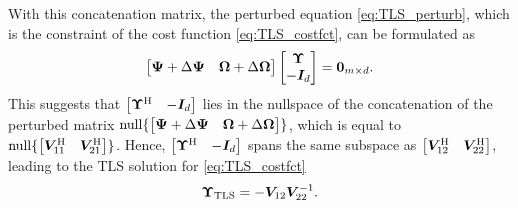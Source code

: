 With this concatenation matrix, the perturbed equation \eqref{eq:TLS_perturb}, which is the constraint of the cost function \eqref{eq:TLS_costfct}, can be formulated as
\begin{equation} \label{eq:TLS_constraint_matrix}
	\begin{bmatrix} \MtwoPerturb & \MonePerturb \end{bmatrix}
	\begin{bmatrix} \Mthree \\ - \Identity{d} \end{bmatrix}
	= \bm{0}_{m \times d}.
\end{equation}
This suggests that $\begin{bmatrix} \bm{\Upsilon}^{\operatorname{H}} & - \bm{I}_{d} \end{bmatrix}$ lies in the nullspace of the concatenation of the perturbed matrix $\operatorname{null} \{  \begin{bmatrix} \bm{\Psi} + \Delta \bm{\Psi} & \bm{\Omega} + \Delta \bm{\Omega} \end{bmatrix}  \} $, which is equal to $\operatorname{null} \{  \begin{bmatrix} \bm{V}_{11}^{\operatorname{H}} & \bm{V}_{21}^{\operatorname{H}} \end{bmatrix}  \} $. Hence, $\begin{bmatrix} \bm{\Upsilon}^{\operatorname{H}} & - \bm{I}_{d} \end{bmatrix}$ spans the same subspace as $\begin{bmatrix} \bm{V}_{12}^{\operatorname{H}} & \bm{V}_{22}^{\operatorname{H}} \end{bmatrix}$, leading to 
the TLS solution for \eqref{eq:TLS_costfct} %
\begin{equation} \label{eq: TLS_solution}
	\Mthree_{\TLS} = - \VV_{12} \VV_{22}^{-1}.
\end{equation}

